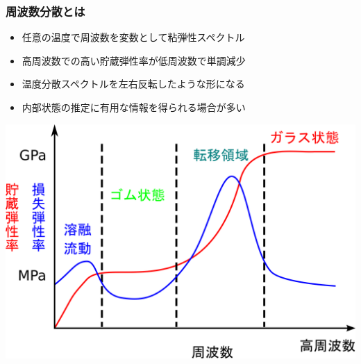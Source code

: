 \documentclass[12pt, dvipdfmx]{beamer}
\begin{document}
\begin{frame}
    \frametitle{周波数分散とは}
		\begin{itemize}
			\item 任意の温度で周波数を変数として粘弾性スペクトル
			\item 高周波数での高い貯蔵弾性率が低周波数で単調減少
			\item 温度分散スペクトルを左右反転したような形になる
			\item 内部状態の推定に有用な情報を得られる場合が多い
		\end{itemize}

		\vspace{2mm}
		\centering
		\includegraphics[width=.7\textwidth]{dynamic_ViscoElast_Freq.png}
\end{frame}
\end{document}
